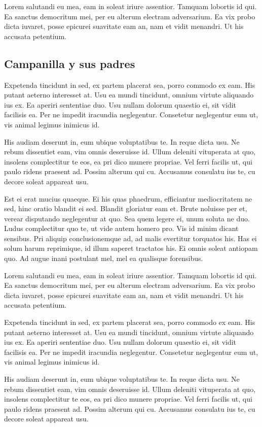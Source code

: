 \documentclass[a4paper, 11pt, titlepage, twocolumn]{book}
\begin{document}
Lorem salutandi eu mea, eam in soleat iriure assentior. Tamquam lobortis id qui. Ea sanctus democritum mei, per eu alterum electram adversarium. Ea vix probo dicta iuvaret, posse epicurei suavitate eam an, nam et vidit menandri. Ut his accusata petentium.

\subsection{Campanilla y sus padres}

Expetenda tincidunt in sed, ex partem placerat sea, porro commodo ex eam. His putant aeterno interesset at. Usu ea mundi tincidunt, omnium virtute aliquando ius ex. Ea aperiri sententiae duo. Usu nullam dolorum quaestio ei, sit vidit facilisis ea. Per ne impedit iracundia neglegentur. Consetetur neglegentur eum ut, vis animal legimus inimicus id.

His audiam deserunt in, eum ubique voluptatibus te. In reque dicta usu. Ne rebum dissentiet eam, vim omnis deseruisse id. Ullum deleniti vituperata at quo, insolens complectitur te eos, ea pri dico munere propriae. Vel ferri facilis ut, qui paulo ridens praesent ad. Possim alterum qui cu. Accusamus consulatu ius te, cu decore soleat appareat usu.

Est ei erat mucius quaeque. Ei his quas phaedrum, efficiantur mediocritatem ne sed, hinc oratio blandit ei sed. Blandit gloriatur eam et. Brute noluisse per et, verear disputando neglegentur at quo. Sea quem legere ei, unum soluta ne duo. Ludus complectitur quo te, ut vide autem homero pro.
\label{HOLA}
Vis id minim dicant sensibus. Pri aliquip conclusionemque ad, ad malis evertitur torquatos his. Has ei solum harum reprimique, id illum saperet tractatos his. Ei omnis soleat antiopam quo. Ad augue inani postulant mel, mel ea qualisque forensibus.

Lorem salutandi eu mea, eam in soleat iriure assentior. Tamquam lobortis id qui. Ea sanctus democritum mei, per eu alterum electram adversarium. Ea vix probo dicta iuvaret, posse epicurei suavitate eam an, nam et vidit menandri. Ut his accusata petentium.

Expetenda tincidunt in sed, ex partem placerat sea, porro commodo ex eam. His putant aeterno interesset at. Usu ea mundi tincidunt, omnium virtute aliquando ius ex. Ea aperiri sententiae duo. Usu nullam dolorum quaestio ei, sit vidit facilisis ea. Per ne impedit iracundia neglegentur. Consetetur neglegentur eum ut, vis animal legimus inimicus id.

His audiam deserunt in, eum ubique voluptatibus te. In reque dicta usu. Ne rebum dissentiet eam, vim omnis deseruisse id. Ullum deleniti vituperata at quo, insolens complectitur te eos, ea pri dico munere propriae. Vel ferri facilis ut, qui paulo ridens praesent ad. Possim alterum qui cu. Accusamus consulatu ius te, cu decore soleat appareat usu.
\end{document}
